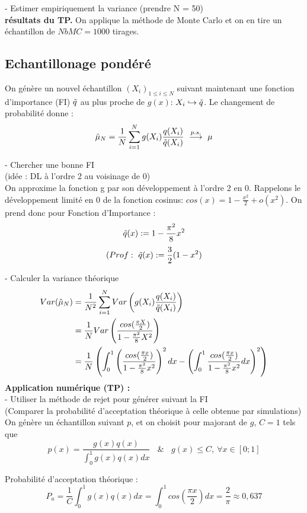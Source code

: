 \documentclass{article}
\begin{document}
- Estimer empiriquement la variance (prendre N = 50)\\
\textbf{résultats du TP.}
On applique la méthode de Monte Carlo et on en tire un échantillon de $NbMC=1000$ tirages.

\subsection{Echantillonage pondéré}
On génère un nouvel échantillon $(X_i)_{1\leq i \leq N}$ suivant maintenant une fonction d'importance (FI) $\Tilde{q}$ au plus proche de $g(x)$: $X_i \hookrightarrow \Tilde{q}$. Le changement de probabilité donne : 
$$ \hat{\mu}_N = \frac1{N} \sum_{i=1}^N g(X_i)\frac{q(X_i)}{\Tilde{q}(X_i)}\ \overset{p.s.}{\longrightarrow}\ \mu $$

- Chercher une bonne FI\\
(idée : DL à l'ordre 2 au voisinage de 0)  \\
On approxime la fonction g par son développement à l'ordre 2 en 0. Rappelons le développement limité en 0 de la fonction cosinus: 
$ cos(x) = 1 - \frac{x^2}{2} + o(x^2) $.
On prend donc pour Fonction d'Importance : 
$$\Tilde{q}(x):= 1 - \frac{\pi^2}{8} x^2$$
$$(Prof :\ \Tilde{q}(x):= \frac32(1 - x^2)$$

- Calculer la variance théorique\\
\begin{align*} 
  Var(\hat{\mu}_N) &= \frac1{N^2} \sum_{i=1}^N Var \left ( g(X_i)\frac{q(X_i)}{\Tilde{q}(X_i)}\right)\\ 
  &= \frac1{N} Var\left (\frac{cos(\frac{\pi X}2)}{1 - \frac{\pi^2}{8} X^2} \right ) \\ 
  &= \frac1{N} \left ( \int_0^1 \left (\frac{cos(\frac{\pi x}2)}{1 - \frac{\pi^2}{8} x^2} \right )^2dx - \left ( \int_0^1 \frac{cos(\frac{\pi x}2)}{1 - \frac{\pi^2}{8} x^2}dx \right )^2 \right )\\
\end{align*}
\textbf{Application numérique (TP) :}
\\

- Utiliser la méthode de rejet pour  générer suivant la FI \\ (Comparer la probabilité d’acceptation théorique à celle obtenue par simulations)\\
On génère un échantillon suivant $p$, et on choisit pour majorant de $g$, $C=1$ tels que 
$$p(x) = \frac{g(x)q(x)}{\int_0^1 g(x)q(x)dx}\ \ \ \ \&\ \ \ \ g(x) \leq C,\ \forall x \in [0;1] $$

Probabilité d'acceptation théorique : 
$$P_a = \frac1C \int_0^1 g(x)q(x)dx 
= \int_0^1 cos(\frac{\pi x}{2})dx 
=\frac{2}{\pi} 
\approx 0,637$$
\end{document}
